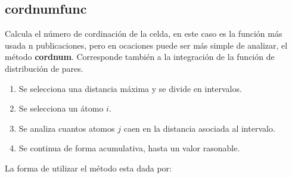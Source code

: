 

\subsection{cordnumfunc}
Calcula el n\'umero de cordinaci\'on de la celda, en este caso es la funci\'on m\'as usada n publicaciones, pero en ocaciones puede ser m\'as simple de analizar, el m\'etodo \textbf{cordnum}. Corresponde tambi\'en a la integraci\'on de la funci\'on de distribuci\'on de pares.
\begin{enumerate}
 \item Se selecciona una distancia m\'axima y se divide en intervalos.
 \item Se selecciona un \'atomo $i$.
 \item Se analiza cuantos atomos $j$ caen en la distancia asociada al intervalo.
 \item Se continua de forma acumulativa, hasta un valor rasonable.
\end{enumerate}

La forma de utilizar el m\'etodo esta dada por:


